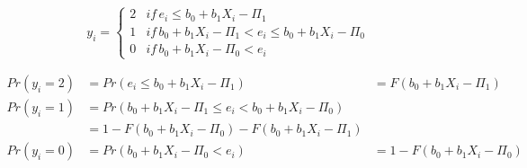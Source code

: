 \begin{equation}
y_{i}=\left\{ \begin{array}{lll}
2 & if\, e_{i}\leq b_{0}+b_{1}X_{i}-\Pi_{1}\\
1 & if\, b_{0}+b_{1}X_{i}-\Pi_{1}<e_{i}\leq b_{0}+b_{1}X_{i}-\Pi_{0}\\
0 & if\, b_{0}+b_{1}X_{i}-\Pi_{0}<e_{i}
\end{array}\right.\label{eq:3category2-1}
\end{equation}




\begin{equation}
\begin{array}{lll}
Pr(y_{i}=2) & =Pr(e_{i}\leq b_{0}+b_{1}X_{i}-\Pi_{1}) & =F(b_{0}+b_{1}X_{i}-\Pi_{1})\\
Pr(y_{i}=1) & =Pr(b_{0}+b_{1}X_{i}-\Pi_{1}\leq e_{i}<b_{0}+b_{1}X_{i}-\Pi_{0})\\
 & =1-F(b_{0}+b_{1}X_{i}-\Pi_{0})-F(b_{0}+b_{1}X_{i}-\Pi_{1})\\
Pr(y_{i}=0) & =Pr(b_{0}+b_{1}X_{i}-\Pi_{0}<e_{i}) & =1-F(b_{0}+b_{1}X_{i}-\Pi_{0})
\end{array}\label{eq:3category2}
\end{equation}
\\

